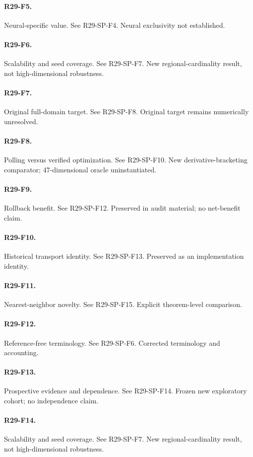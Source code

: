 \paragraph{R29-F5.} Neural-specific value. See R29-SP-F4. Neural exclusivity not established.
\paragraph{R29-F6.} Scalability and seed coverage. See R29-SP-F7. New regional-cardinality result, not high-dimensional robustness.
\paragraph{R29-F7.} Original full-domain target. See R29-SP-F8. Original target remains numerically unresolved.
\paragraph{R29-F8.} Polling versus verified optimization. See R29-SP-F10. New derivative-bracketing comparator; 47-dimensional oracle uninstantiated.
\paragraph{R29-F9.} Rollback benefit. See R29-SP-F12. Preserved in audit material; no net-benefit claim.
\paragraph{R29-F10.} Historical transport identity. See R29-SP-F13. Preserved as an implementation identity.
\paragraph{R29-F11.} Nearest-neighbor novelty. See R29-SP-F15. Explicit theorem-level comparison.
\paragraph{R29-F12.} Reference-free terminology. See R29-SP-F6. Corrected terminology and accounting.
\paragraph{R29-F13.} Prospective evidence and dependence. See R29-SP-F14. Frozen new exploratory cohort; no independence claim.
\paragraph{R29-F14.} Scalability and seed coverage. See R29-SP-F7. New regional-cardinality result, not high-dimensional robustness.
